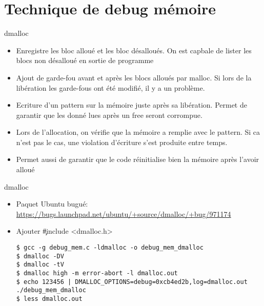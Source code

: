 \section{Technique de debug mémoire}

\begin{frame}[fragile=singleslide]{dmalloc}
  \begin{itemize}
  \item  Enregistre les  bloc alloué  et les  bloc désalloués.  On est
    capbale de lister les blocs non désalloué en sortie de programme
  \item  Ajout de  garde-fou  avant  et après  les  blocs alloués  par
    malloc. Si lors  de la libération les garde-fous  ont été modifié,
    il y a un problème.
  \item  Ecriture   d'un  pattern  sur  la  mémoire   juste  après  sa
    libération. Permet  de garantir que  les donné lues après  un free
    seront corrompue.
  \item Lors de l'allocation, on vérifie que la mémoire a remplie avec
    le pattern. Si ca n'est pas le cas, une violation d'écriture s'est
    produite entre temps.
  \item  Permet aussi  de garantir  que le  code réinitialise  bien la
    mémoire après l'avoir alloué
  \end{itemize}
\end{frame}

\begin{frame}[fragile=singleslide]{dmalloc}
  \begin{itemize} 
  \item Paquet Ubuntu bugué: \url{https://bugs.launchpad.net/ubuntu/+source/dmalloc/+bug/971174}
  \item Ajouter \c{#include <dmalloc.h>}
  \begin{lstlisting}
$ gcc -g debug_mem.c -ldmalloc -o debug_mem_dmalloc
$ dmalloc -DV
$ dmalloc -tV
$ dmalloc high -m error-abort -l dmalloc.out
$ echo 123456 | DMALLOC_OPTIONS=debug=0xcb4ed2b,log=dmalloc.out ./debug_mem_dmalloc
$ less dmalloc.out
  \end{lstlisting}
  \end{itemize}
\end{frame}

